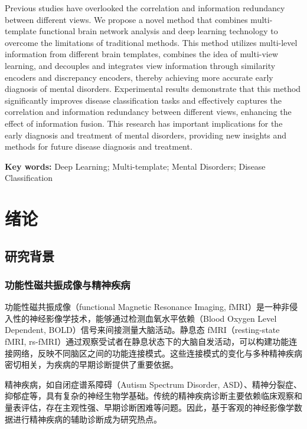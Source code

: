 \documentclass[12pt,a4paper]{article}
\begin{document}
Previous studies have overlooked the correlation and information redundancy between different views. We propose a novel method that combines multi-template functional brain network analysis and deep learning technology to overcome the limitations of traditional methods. This method utilizes multi-level information from different brain templates, combines the idea of multi-view learning, and decouples and integrates view information through similarity encoders and discrepancy encoders, thereby achieving more accurate early diagnosis of mental disorders. Experimental results demonstrate that this method significantly improves disease classification tasks and effectively captures the correlation and information redundancy between different views, enhancing the effect of information fusion. This research has important implications for the early diagnosis and treatment of mental disorders, providing new insights and methods for future disease diagnosis and treatment.

\textbf{Key words:} Deep Learning; Multi-template; Mental Disorders; Disease Classification

\newpage

\tableofcontents

\newpage

\section{绪论}

\subsection{研究背景}

\subsubsection{功能性磁共振成像与精神疾病}

功能性磁共振成像（functional Magnetic Resonance Imaging, fMRI）是一种非侵入性的神经影像学技术，能够通过检测血氧水平依赖（Blood Oxygen Level Dependent, BOLD）信号来间接测量大脑活动。静息态 fMRI（resting-state fMRI, rs-fMRI）通过观察受试者在静息状态下的大脑自发活动，可以构建功能连接网络，反映不同脑区之间的功能连接模式。这些连接模式的变化与多种精神疾病密切相关，为疾病的早期诊断提供了重要依据。

精神疾病，如自闭症谱系障碍（Autism Spectrum Disorder, ASD）、精神分裂症、抑郁症等，具有复杂的神经生物学基础。传统的精神疾病诊断主要依赖临床观察和量表评估，存在主观性强、早期诊断困难等问题。因此，基于客观的神经影像学数据进行精神疾病的辅助诊断成为研究热点。
\end{document}
